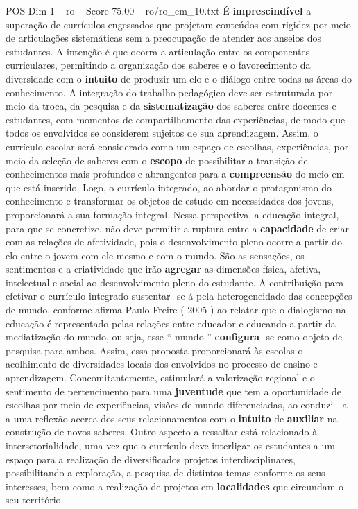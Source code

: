 \begin{textsample}{POS Dim 1 – ro – Score 75.00 – ro/ro\_em\_10.txt}
É \textbf{imprescindível} a superação de currículos engessados que projetam conteúdos com rigidez por meio de articulações sistemáticas sem a preocupação de atender aos anseios dos estudantes.
A intenção é que ocorra a articulação entre os componentes curriculares, permitindo a organização dos saberes e o favorecimento da diversidade com o \textbf{intuito} de produzir um elo e o diálogo entre todas as áreas do conhecimento.
A integração do trabalho pedagógico deve ser estruturada por meio da troca, da pesquisa e da \textbf{sistematização} dos saberes entre docentes e estudantes, com momentos de compartilhamento das experiências, de modo que todos os envolvidos se considerem sujeitos de sua aprendizagem.
Assim, o currículo escolar será considerado como um espaço de escolhas, experiências, por meio da seleção de saberes com o \textbf{escopo} de possibilitar a transição de conhecimentos mais profundos e abrangentes para a \textbf{compreensão} do meio em que está inserido.
Logo, o currículo integrado, ao abordar o protagonismo do conhecimento e transformar os objetos de estudo em necessidades dos jovens, proporcionará a sua formação integral.
Nessa perspectiva, a educação integral, para que se concretize, não deve permitir a ruptura entre a \textbf{capacidade} de criar com as relações de afetividade, pois o desenvolvimento pleno ocorre a partir do elo entre o jovem com ele mesmo e com o mundo.
São as sensações, os sentimentos e a criatividade que irão \textbf{agregar} as dimensões física, afetiva, intelectual e social ao desenvolvimento pleno do estudante.
A contribuição para efetivar o currículo integrado sustentar -se-á pela heterogeneidade das concepções de mundo, conforme afirma Paulo Freire ( 2005 ) ao relatar que o dialogismo na educação é representado pelas relações entre educador e educando a partir da mediatização do mundo, ou seja, esse “ mundo ” \textbf{configura} -se como objeto de pesquisa para ambos.
Assim, essa proposta proporcionará às escolas o acolhimento de diversidades locais dos envolvidos no processo de ensino e aprendizagem.
Concomitantemente, estimulará a valorização regional e o sentimento de pertencimento para uma \textbf{juventude} que tem a oportunidade de escolhas por meio de experiências, visões de mundo diferenciadas, ao conduzi -la a uma reflexão acerca dos seus relacionamentos com o \textbf{intuito} de \textbf{auxiliar} na construção de novos saberes.
Outro aspecto a ressaltar está relacionado à intersetorialidade, uma vez que o currículo deve interligar os estudantes a um espaço para a realização de diversificados projetos interdisciplinares, possibilitando a exploração, a pesquisa de distintos temas conforme os seus interesses, bem como a realização de projetos em \textbf{localidades} que circundam o seu território.

\end{textsample}
